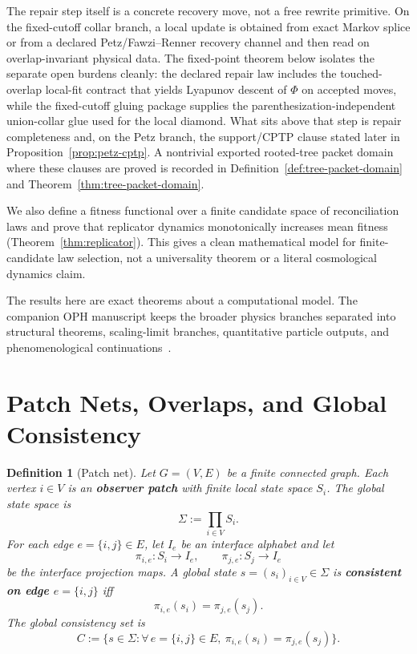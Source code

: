 \documentclass[11pt]{article}
\newtheorem{definition}[theorem]{Definition}
\theoremstyle{remark}
\theoremstyle{plain}
\begin{document}
The repair step itself is a concrete recovery move, not a free rewrite primitive. On the
fixed-cutoff collar branch, a local update is obtained from exact Markov splice or from a
declared Petz/Fawzi--Renner recovery channel and then read on overlap-invariant physical data.
The fixed-point theorem below isolates the separate open burdens cleanly: the declared
repair law includes the touched-overlap local-fit contract that yields Lyapunov descent of
\(\Phi\) on accepted moves, while the fixed-cutoff gluing package supplies the
parenthesization-independent union-collar glue used for the local diamond. What sits above
that step is repair completeness and, on the Petz branch, the support/CPTP clause stated later in
Proposition~\ref{prop:petz-cptp}.
A nontrivial exported rooted-tree packet domain where these clauses are proved is recorded in
Definition~\ref{def:tree-packet-domain} and Theorem~\ref{thm:tree-packet-domain}.

We also define a fitness functional over a finite candidate space of reconciliation laws and prove
that replicator dynamics monotonically increases mean fitness (Theorem~\ref{thm:replicator}). This
gives a clean mathematical model for finite-candidate law selection, not a universality theorem or
a literal cosmological dynamics claim.

The results here are exact theorems about a computational model. The companion OPH manuscript
keeps the broader physics branches separated into structural theorems, scaling-limit branches,
quantitative particle outputs, and phenomenological continuations~\cite{OPH}.


\section{Patch Nets, Overlaps, and Global Consistency}

\begin{definition}[Patch net]\label{def:patchnet}
Let $G=(V,E)$ be a finite connected graph. Each vertex $i\in V$ is an \textbf{observer patch} with finite local state space $S_i$. The global state space is
\[
\Sigma := \prod_{i\in V} S_i.
\]
For each edge $e=\{i,j\}\in E$, let $I_e$ be an interface alphabet and let
\[
\pi_{i,e}:S_i\to I_e,
\qquad
\pi_{j,e}:S_j\to I_e
\]
be the interface projection maps. A global state $s=(s_i)_{i\in V}\in\Sigma$ is \textbf{consistent on edge $e=\{i,j\}$} iff
\[
\pi_{i,e}(s_i)=\pi_{j,e}(s_j).
\]
The global consistency set is
\[
C:=\bigl\{s\in\Sigma:\forall\, e=\{i,j\}\in E,\ \pi_{i,e}(s_i)=\pi_{j,e}(s_j)\bigr\}.
\]
\end{definition}
\end{document}
